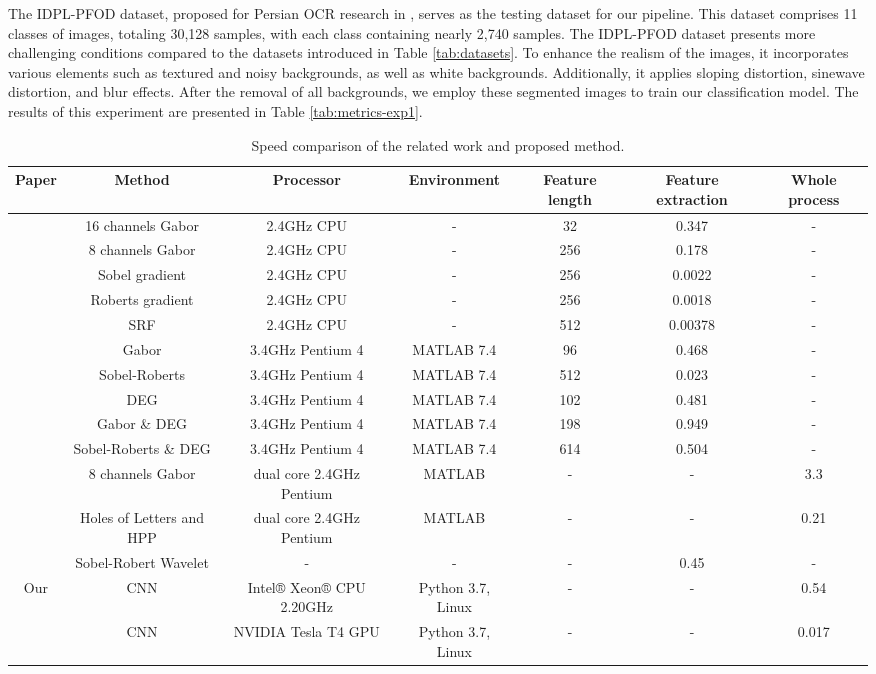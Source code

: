 \documentclass[conference]{IEEEtran}
\begin{document}
The IDPL-PFOD dataset, proposed for Persian OCR research in \cite{29}, serves as the testing dataset for our pipeline. This dataset comprises 11 classes of images, totaling 30,128 samples, with each class containing nearly 2,740 samples.
The IDPL-PFOD dataset presents more challenging conditions compared to the datasets introduced in Table \ref{tab:datasets}. To enhance the realism of the images, it incorporates various elements such as textured and noisy backgrounds, as well as white backgrounds. Additionally, it applies sloping distortion, sinewave distortion, and blur effects.
After the removal of all backgrounds, we employ these segmented images to train our classification model. The results of this experiment are presented in Table \ref{tab:metrics-exp1}.


\begin{table*}[t!]
\centering
\caption{Speed comparison of the related work and proposed method. \label{tab:speed}}
\begin{tabular}{ccccccc}
\toprule
\textbf{Paper} & \textbf{Method} & \textbf{Processor} & \textbf{Environment}  & \textbf{Feature length} & \textbf{Feature extraction}  & \textbf{Whole process} \\
\midrule

\multirow{5}{*}{\cite{2}} &
16 channels Gabor &  2.4GHz CPU & - &  32   &  0.347 & - \\
& 8 channels Gabor & 2.4GHz CPU & - &  256 &  0.178 & -  \\
& Sobel gradient  & 2.4GHz CPU & - &  256 &  0.0022  & - \\
& Roberts gradient  &  2.4GHz CPU & - &  256  &  0.0018  & - \\
& SRF  & 2.4GHz CPU & - & 512 & 0.00378 & - \\


\multirow{5}{*}{\cite{10}} &
Gabor &  3.4GHz Pentium 4 & MATLAB 7.4 & 96 &  0.468 & - \\
& Sobel-Roberts &  3.4GHz Pentium 4 & MATLAB 7.4 & 512 &  0.023 & - \\
& DEG &  3.4GHz Pentium 4 & MATLAB 7.4 & 102 & 0.481 & - \\
& Gabor \& DEG &  3.4GHz Pentium 4 & MATLAB 7.4 & 198 & 0.949 & - \\
& Sobel-Roberts \& DEG & 3.4GHz Pentium 4 & MATLAB 7.4 & 614 & 0.504 & - \\

\multirow{2}{*}{\cite{10}} &
8 channels Gabor & dual core 2.4GHz Pentium & MATLAB & - & - & 3.3  \\
& Holes of Letters and HPP & dual core 2.4GHz Pentium & MATLAB & - & - &  0.21 \\

\multirow{1}{*}{\cite{8}} &
Sobel-Robert Wavelet & - & - & - & 0.45 & -  \\


\multirow{2}{*}{Our} &
CNN & Intel® Xeon® CPU 2.20GHz & Python 3.7, Linux & - & - & 0.54\\
& CNN & NVIDIA Tesla T4 GPU & Python 3.7, Linux & - & - & 0.017   \\


\bottomrule
\end{tabular}
\end{table*}
\end{document}
